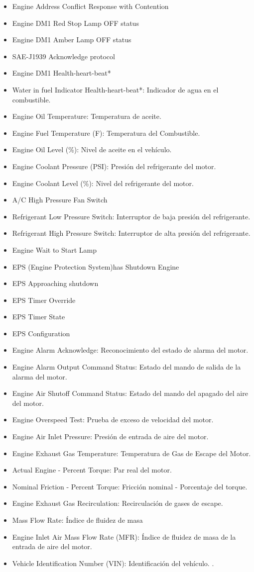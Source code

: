 \begin{itemize}
\item Engine Address Conflict Response with Contention
\item Engine DM1 Red Stop Lamp OFF status
\item Engine DM1 Amber Lamp OFF status
\item SAE-J1939 Acknowledge protocol
\item Engine DM1 Health-heart-beat*
\item Water in fuel Indicator Health-heart-beat*: Indicador de agua en el combustible.
\item Engine Oil Temperature: Temperatura de aceite.
\item Engine Fuel Temperature (F): Temperatura del Combustible.
\item Engine Oil Level (\%): Nivel de aceite en el vehículo.
\item Engine Coolant Pressure (PSI): Presión del refrigerante del motor.
\item Engine Coolant Level (\%): Nivel del refrigerante del motor.
\item A/C High Pressure Fan Switch
\item Refrigerant Low Pressure Switch: Interruptor de baja presión del refrigerante.
\item Refrigerant High Pressure Switch: Interruptor de alta presión del refrigerante.
\item Engine Wait to Start Lamp
\item EPS (Engine Protection System)has Shutdown Engine
\item EPS Approaching shutdown
\item EPS Timer Override
\item EPS Timer State
\item EPS Configuration
\item Engine Alarm Acknowledge: Reconocimiento del estado de alarma del motor.
\item Engine Alarm Output Command Status: Estado del mando de salida de la alarma del motor.
\item Engine Air Shutoff Command Status: Estado del mando del apagado del aire del motor.
\item Engine Overspeed Test: Prueba de exceso de velocidad del motor.
\item Engine Air Inlet Pressure: Presión de entrada de aire del motor.
\item Engine Exhaust Gas Temperature: Temperatura de Gas de Escape del Motor.
\item Actual Engine - Percent Torque: Par real del motor.
\item Nominal Friction - Percent Torque: Fricción nominal - Porcentaje del torque.
\item Engine Exhaust Gas Recirculation: Recirculación de gases de escape.
\item Mass Flow Rate:  Índice de fluidez de masa
\item Engine Inlet Air Mass Flow Rate (MFR): Índice de fluidez de masa de la entrada de aire del motor. 
\item Vehicle Identification Number (VIN): Identificación del vehículo.
  \cite{param}.

\end{itemize}
